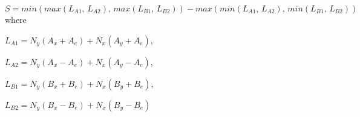 \documentclass[12pt]{article}
\begin{document}
$$S = min(max(L_{A1},\, L_{A2}),\, max(L_{B1},\, L_{B2})) - max(min(L_{A1},\, L_{A2}),\, min(L_{B1},\, L_{B2}))$$ 
where 
\begin{description}
	\item $L_{A1} = N_y(A_x + A_e) + N_x(A_y + A_e)$, 
	\item $L_{A2} = N_y(A_x - A_e) + N_x(A_y - A_e)$, 
	\item $L_{B1} = N_y(B_x + B_e) + N_x(B_y + B_e)$, 
	\item $L_{B2} = N_y(B_x - B_e) + N_x(B_y - B_e)$
\end{description}
\end{document}
